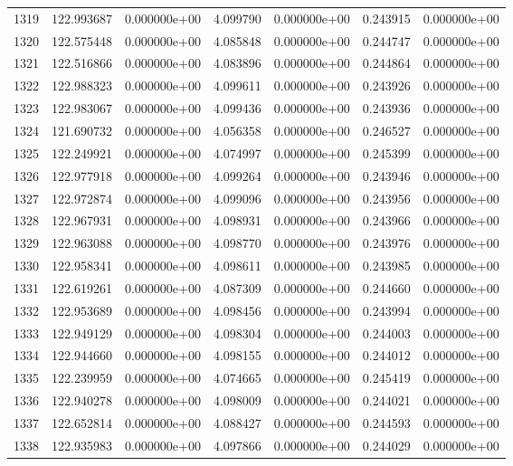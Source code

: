 \begin{tabular}{rrrrrrr}
1319 & 122.993687 &  0.000000e+00 &  4.099790 &  0.000000e+00 &    0.243915 &  0.000000e+00 \\
1320 & 122.575448 &  0.000000e+00 &  4.085848 &  0.000000e+00 &    0.244747 &  0.000000e+00 \\
1321 & 122.516866 &  0.000000e+00 &  4.083896 &  0.000000e+00 &    0.244864 &  0.000000e+00 \\
1322 & 122.988323 &  0.000000e+00 &  4.099611 &  0.000000e+00 &    0.243926 &  0.000000e+00 \\
1323 & 122.983067 &  0.000000e+00 &  4.099436 &  0.000000e+00 &    0.243936 &  0.000000e+00 \\
1324 & 121.690732 &  0.000000e+00 &  4.056358 &  0.000000e+00 &    0.246527 &  0.000000e+00 \\
1325 & 122.249921 &  0.000000e+00 &  4.074997 &  0.000000e+00 &    0.245399 &  0.000000e+00 \\
1326 & 122.977918 &  0.000000e+00 &  4.099264 &  0.000000e+00 &    0.243946 &  0.000000e+00 \\
1327 & 122.972874 &  0.000000e+00 &  4.099096 &  0.000000e+00 &    0.243956 &  0.000000e+00 \\
1328 & 122.967931 &  0.000000e+00 &  4.098931 &  0.000000e+00 &    0.243966 &  0.000000e+00 \\
1329 & 122.963088 &  0.000000e+00 &  4.098770 &  0.000000e+00 &    0.243976 &  0.000000e+00 \\
1330 & 122.958341 &  0.000000e+00 &  4.098611 &  0.000000e+00 &    0.243985 &  0.000000e+00 \\
1331 & 122.619261 &  0.000000e+00 &  4.087309 &  0.000000e+00 &    0.244660 &  0.000000e+00 \\
1332 & 122.953689 &  0.000000e+00 &  4.098456 &  0.000000e+00 &    0.243994 &  0.000000e+00 \\
1333 & 122.949129 &  0.000000e+00 &  4.098304 &  0.000000e+00 &    0.244003 &  0.000000e+00 \\
1334 & 122.944660 &  0.000000e+00 &  4.098155 &  0.000000e+00 &    0.244012 &  0.000000e+00 \\
1335 & 122.239959 &  0.000000e+00 &  4.074665 &  0.000000e+00 &    0.245419 &  0.000000e+00 \\
1336 & 122.940278 &  0.000000e+00 &  4.098009 &  0.000000e+00 &    0.244021 &  0.000000e+00 \\
1337 & 122.652814 &  0.000000e+00 &  4.088427 &  0.000000e+00 &    0.244593 &  0.000000e+00 \\
1338 & 122.935983 &  0.000000e+00 &  4.097866 &  0.000000e+00 &    0.244029 &  0.000000e+00 \\

\end{tabular}
